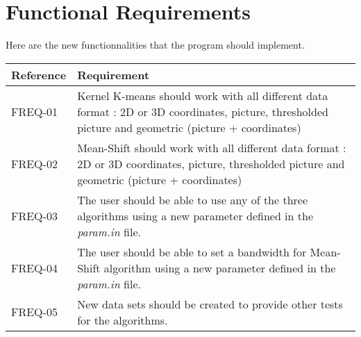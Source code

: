 \section{Functional Requirements}
Here are the new functionnalities that the program should implement.
\begin{flushleft}
    \begin{tabular}{ | p{} |  p{} |}
    \hline
   	\textbf{Reference} & \textbf{Requirement}
    \\
    \hline
	FREQ-01 & Kernel K-means should work with all different data format : 2D or 3D coordinates, picture, thresholded picture and geometric (picture + coordinates)
    \\ 
    \hline
	FREQ-02 & Mean-Shift should work with all different data format : 2D or 3D coordinates, picture, thresholded picture and geometric (picture + coordinates)
    \\ 
    \hline
	FREQ-03 & The user should be able to use any of the three algorithms using a new parameter defined in the \textit{param.in} file.
    \\ 
    \hline
   	FREQ-04 & The user should be able to set a bandwidth for Mean-Shift algorithm using a new parameter defined in the \textit{param.in} file.
   	\\ 
    \hline
    FREQ-05 & New data sets should be created to provide other tests for the algorithms.
   	\\ 
    \hline
    \end{tabular}
\end{flushleft}
